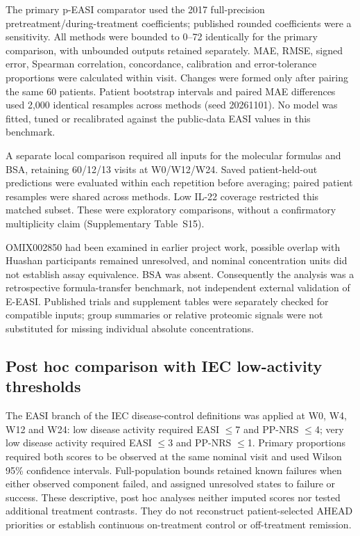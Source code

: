 The primary p-EASI comparator used the 2017 full-precision pretreatment/during-treatment coefficients; published rounded coefficients were a sensitivity. All methods were bounded to 0--72 identically for the primary comparison, with unbounded outputs retained separately. MAE, RMSE, signed error, Spearman correlation, concordance, calibration and error-tolerance proportions were calculated within visit. Changes were formed only after pairing the same 60 patients. Patient bootstrap intervals and paired MAE differences used 2,000 identical resamples across methods (seed 20261101). No model was fitted, tuned or recalibrated against the public-data EASI values in this benchmark.

A separate local comparison required all inputs for the molecular formulas and BSA, retaining 60/12/13 visits at W0/W12/W24. Saved patient-held-out predictions were evaluated within each repetition before averaging; paired patient resamples were shared across methods. Low IL-22 coverage restricted this matched subset. These were exploratory comparisons, without a confirmatory multiplicity claim (Supplementary Table~S15).

OMIX002850 had been examined in earlier project work, possible overlap with Huashan participants remained unresolved, and nominal concentration units did not establish assay equivalence. BSA was absent. Consequently the analysis was a retrospective formula-transfer benchmark, not independent external validation of E-EASI. Published trials and supplement tables were separately checked for compatible inputs; group summaries or relative proteomic signals were not substituted for missing individual absolute concentrations.

\subsection{Post hoc comparison with IEC low-activity thresholds}
The EASI branch of the IEC disease-control definitions was applied at W0, W4, W12 and W24: low disease activity required EASI $\leq$7 and PP-NRS $\leq$4; very low disease activity required EASI $\leq$3 and PP-NRS $\leq$1.\citep{merola2026iec} Primary proportions required both scores to be observed at the same nominal visit and used Wilson 95\% confidence intervals. Full-population bounds retained known failures when either observed component failed, and assigned unresolved states to failure or success. These descriptive, post hoc analyses neither imputed scores nor tested additional treatment contrasts. They do not reconstruct patient-selected AHEAD priorities or establish continuous on-treatment control or off-treatment remission.

